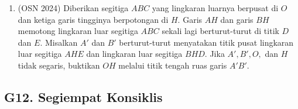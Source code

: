 \documentclass[12pt,a4paper]{article}
\begin{document}
\begin{enumerate}
\item (OSN 2024) Diberikan segitiga $ABC$ yang lingkaran luarnya berpusat di $O$ dan ketiga garis tingginya berpotongan di $H$. Garis $AH$ dan garis $BH$ memotong lingkaran luar segitiga $ABC$ sekali lagi berturut-turut di titik $D$ dan $E$. Misalkan $A'$ dan $B'$ berturut-turut menyatakan titik pusat lingkaran luar segitiga $AHE$ dan lingkaran luar segitiga $BHD$. Jika $A', B', O,$ dan $H$ tidak segaris, buktikan $OH$ melalui titik tengah ruas garis $A'B'$.

\end{enumerate}

\subsection{G12. Segiempat Konsiklis}
\end{document}

